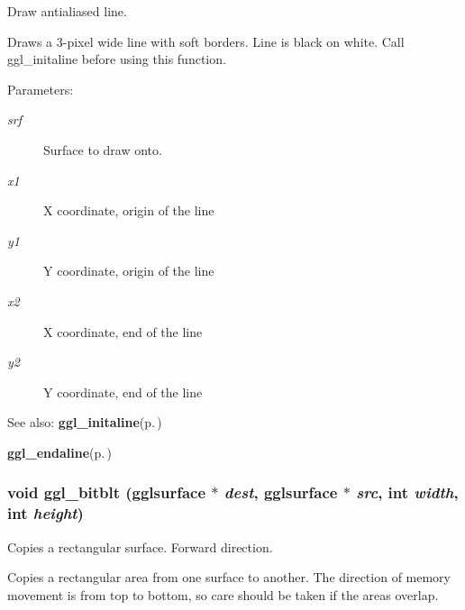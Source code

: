 Draw antialiased line. 

Draws a 3-pixel wide line with soft borders. Line is black on white. Call ggl\_\-initaline before using this function.

\begin{Desc}
\item[Parameters:]
\begin{description}
\item[{\em srf}]Surface to draw onto. \item[{\em x1}]X coordinate, origin of the line \item[{\em y1}]Y coordinate, origin of the line \item[{\em x2}]X coordinate, end of the line \item[{\em y2}]Y coordinate, end of the line\end{description}
\end{Desc}
\begin{Desc}
\item[See also:]{\bf ggl\_\-initaline}{\rm (p.\,\pageref{ggl_8h_a34})} 

{\bf ggl\_\-endaline}{\rm (p.\,\pageref{ggl_8h_a36})} \end{Desc}
\subsubsection{\setlength{\rightskip}{0pt plus 5cm}void ggl\_\-bitblt ({\bf gglsurface} $\ast$ {\em dest}, {\bf gglsurface} $\ast$ {\em src}, int {\em width}, int {\em height})}\label{ggl_8h_a19}


Copies a rectangular surface. Forward direction. 

Copies a rectangular area from one surface to another. The direction of memory movement is from top to bottom, so care should be taken if the areas overlap.

